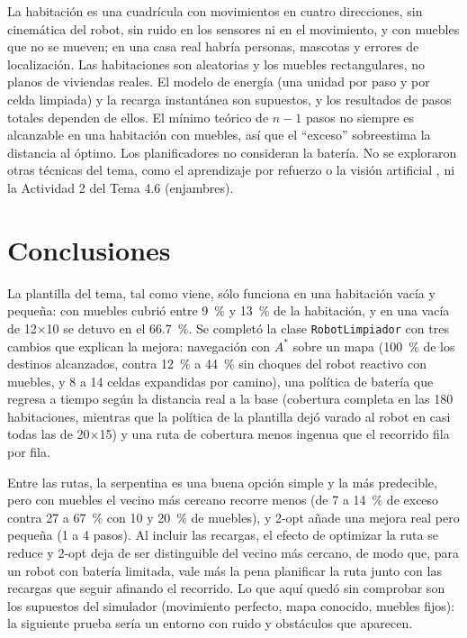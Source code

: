 \documentclass[11pt,letterpaper]{article}
\begin{document}
La habitación es una cuadrícula con movimientos en cuatro direcciones, sin cinemática del robot, sin ruido en los sensores ni en el movimiento, y con muebles que no se mueven; en una casa real habría personas, mascotas y errores de localización. Las habitaciones son aleatorias y los muebles rectangulares, no planos de viviendas reales. El modelo de energía (una unidad por paso y por celda limpiada) y la recarga instantánea son supuestos, y los resultados de pasos totales dependen de ellos. El mínimo teórico de $n - 1$ pasos no siempre es alcanzable en una habitación con muebles, así que el ``exceso'' sobreestima la distancia al óptimo. Los planificadores no consideran la batería. No se exploraron otras técnicas del tema, como el aprendizaje por refuerzo o la visión artificial \parencite{iae_u4_t46}, ni la Actividad 2 del Tema 4.6 (enjambres).

\section{Conclusiones}

La plantilla del tema, tal como viene, sólo funciona en una habitación vacía y pequeña: con muebles cubrió entre 9~\% y 13~\% de la habitación, y en una vacía de 12$\times$10 se detuvo en el 66.7~\%. Se completó la clase \texttt{RobotLimpiador} con tres cambios que explican la mejora: navegación con $A^*$ sobre un mapa (100~\% de los destinos alcanzados, contra 12~\% a 44~\% sin choques del robot reactivo con muebles, y 8 a 14 celdas expandidas por camino), una política de batería que regresa a tiempo según la distancia real a la base (cobertura completa en las 180 habitaciones, mientras que la política de la plantilla dejó varado al robot en casi todas las de 20$\times$15) y una ruta de cobertura menos ingenua que el recorrido fila por fila.

Entre las rutas, la serpentina es una buena opción simple y la más predecible, pero con muebles el vecino más cercano recorre menos (de 7 a 14~\% de exceso contra 27 a 67~\% con 10 y 20~\% de muebles), y 2-opt añade una mejora real pero pequeña (1 a 4 pasos). Al incluir las recargas, el efecto de optimizar la ruta se reduce y 2-opt deja de ser distinguible del vecino más cercano, de modo que, para un robot con batería limitada, vale más la pena planificar la ruta junto con las recargas que seguir afinando el recorrido. Lo que aquí quedó sin comprobar son los supuestos del simulador (movimiento perfecto, mapa conocido, muebles fijos): la siguiente prueba sería un entorno con ruido y obstáculos que aparecen.

\end{document}
